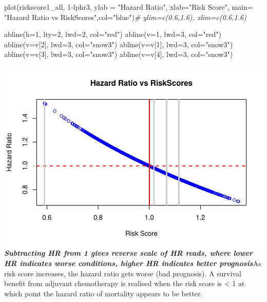 \documentclass[
  11pt,
]{article}
\newenvironment{Shaded}{\begin{snugshade}}{\end{snugshade}}
\newcommand{\AttributeTok}[1]{\textcolor[rgb]{0.77,0.63,0.00}{#1}}
\newcommand{\CommentTok}[1]{\textcolor[rgb]{0.56,0.35,0.01}{\textit{#1}}}
\newcommand{\DecValTok}[1]{\textcolor[rgb]{0.00,0.00,0.81}{#1}}
\newcommand{\FunctionTok}[1]{\textcolor[rgb]{0.00,0.00,0.00}{#1}}
\newcommand{\NormalTok}[1]{#1}
\newcommand{\SpecialCharTok}[1]{\textcolor[rgb]{0.00,0.00,0.00}{#1}}
\newcommand{\StringTok}[1]{\textcolor[rgb]{0.31,0.60,0.02}{#1}}
\begin{document}
\begin{Shaded}
\begin{Highlighting}[]
\FunctionTok{plot}\NormalTok{(riskscore1\_all, }\DecValTok{1}\SpecialCharTok{{-}}\NormalTok{lphr3, }\AttributeTok{ylab =} \StringTok{"Hazard Ratio"}\NormalTok{, }\AttributeTok{xlab=}\StringTok{"Risk Score"}\NormalTok{,}
     \AttributeTok{main=} \StringTok{"Hazard Ratio vs RiskScores"}\NormalTok{,}\AttributeTok{col=}\StringTok{"blue"}\NormalTok{)}\CommentTok{\# ylim=c(0.6,1.6), xlim=c(0.6,1.6)}

\FunctionTok{abline}\NormalTok{(}\AttributeTok{h=}\DecValTok{1}\NormalTok{, }\AttributeTok{lty=}\DecValTok{2}\NormalTok{, }\AttributeTok{lwd=}\DecValTok{2}\NormalTok{, }\AttributeTok{col=}\StringTok{"red"}\NormalTok{)}
\FunctionTok{abline}\NormalTok{(}\AttributeTok{v=}\DecValTok{1}\NormalTok{, }\AttributeTok{lwd=}\DecValTok{3}\NormalTok{, }\AttributeTok{col=}\StringTok{"red"}\NormalTok{)}
\FunctionTok{abline}\NormalTok{(}\AttributeTok{v=}\NormalTok{v[}\DecValTok{2}\NormalTok{], }\AttributeTok{lwd=}\DecValTok{3}\NormalTok{, }\AttributeTok{col=}\StringTok{"snow3"}\NormalTok{)}
\FunctionTok{abline}\NormalTok{(}\AttributeTok{v=}\NormalTok{v[}\DecValTok{1}\NormalTok{], }\AttributeTok{lwd=}\DecValTok{3}\NormalTok{, }\AttributeTok{col=}\StringTok{"snow3"}\NormalTok{)}
\FunctionTok{abline}\NormalTok{(}\AttributeTok{v=}\NormalTok{v[}\DecValTok{3}\NormalTok{], }\AttributeTok{lwd=}\DecValTok{3}\NormalTok{, }\AttributeTok{col=}\StringTok{"snow3"}\NormalTok{)}
\FunctionTok{abline}\NormalTok{(}\AttributeTok{v=}\NormalTok{v[}\DecValTok{4}\NormalTok{], }\AttributeTok{lwd=}\DecValTok{3}\NormalTok{, }\AttributeTok{col=}\StringTok{"snow3"}\NormalTok{)}
\end{Highlighting}
\end{Shaded}

\includegraphics{Hazard_and_Risk_plot_updated_files/figure-latex/unnamed-chunk-9-1.pdf}
\textbf{\emph{Subtracting HR from 1 gives reverse scale of HR reads,
where lower HR indicates worse conditions, higher HR indicates better
prognosis}}\newline As risk score increases, the hazard ratio gets worse
(bad prognosis). A survival benefit from adjuvant chemotherapy is
realised when the risk score is \textless{} 1 at which point the hazard
ratio of mortality appears to be better.
\end{document}
